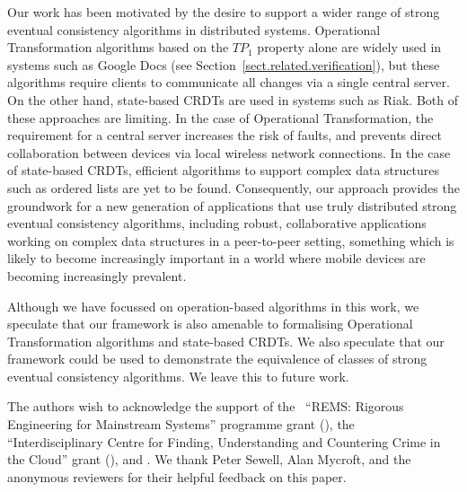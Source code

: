 \documentclass[acmsmall,screen]{acmart}
\begin{document}
Our work has been motivated by the desire to support a wider range of strong eventual consistency algorithms in distributed systems.
Operational Transformation algorithms based on the $\mathit{TP}_1$ property alone are widely used in systems such as Google Docs (see Section~\ref{sect.related.verification}), but these algorithms require clients to communicate all changes via a single central server.
On the other hand, state-based CRDTs are used in systems such as Riak.
Both of these approaches are limiting.
In the case of Operational Transformation, the requirement for a central server increases the risk of faults, and prevents direct collaboration between devices via local wireless network connections.
In the case of state-based CRDTs, efficient algorithms to support complex data structures such as ordered lists are yet to be found.
Consequently, our approach provides the groundwork for a new generation of applications that use truly distributed strong eventual consistency algorithms, including robust, collaborative applications working on complex data structures in a peer-to-peer setting, something which is likely to become increasingly important in a world where mobile devices are becoming increasingly prevalent.

Although we have focussed on operation-based algorithms in this work, we speculate that our framework is also amenable to formalising Operational Transformation algorithms and state-based CRDTs.
We also speculate that our framework could be used to demonstrate the equivalence of classes of strong eventual consistency algorithms.
We leave this to future work.

\begin{acks}
    The authors wish to acknowledge the support of the~ ``REMS: Rigorous Engineering for Mainstream Systems'' programme grant (),
    the~ ``Interdisciplinary Centre for Finding, Understanding and Countering Crime in the Cloud'' grant (),
    and .
    We thank Peter Sewell, Alan Mycroft, and the anonymous reviewers for their helpful feedback on this paper.
\end{acks}

{}
\end{document}
